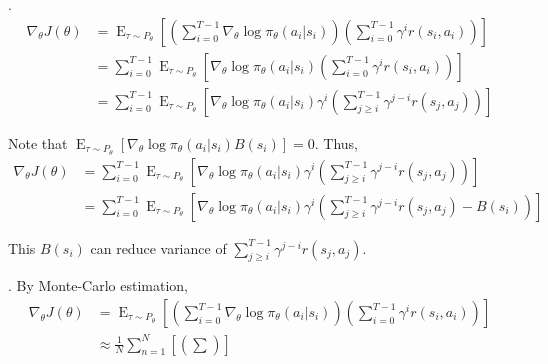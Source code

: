 \documentclass[8pt]{beamer}
\newcommand{\expe}{\operatorname{E}}
\begin{document}
\begin{frame}{.}
    \[
    \begin{aligned}
        \nabla_\theta J(\theta) &= \expe_{\tau \sim P_\theta} 
        \left[ \left(\sum_{i=0}^{T-1}\nabla_\theta \log{\pi_\theta}(a_i|s_i)\right) \left(\sum_{i=0}^{T-1} \gamma^i r(s_i, a_i) \right) \right] \\
        &= \sum_{i=0}^{T-1} \expe_{\tau \sim P_\theta} \left[
            \nabla_\theta \log{\pi_\theta(a_i|s_i)} \left(\sum_{i=0}^{T-1} \gamma^i r(s_i, a_i)\right)
        \right] \\
        &= \sum_{i=0}^{T-1} \expe_{\tau \sim P_\theta} \left[
            \nabla_\theta \log{\pi_\theta (a_i|s_i)} \gamma^i \left(\sum_{j\geq i}^{T-1} \gamma^{j-i}r(s_j, a_j)\right)
        \right]
    \end{aligned}
    \]

    Note that $\expe_{\tau \sim P_\theta}[\nabla_\theta \log{\pi_\theta}(a_i|s_i) B(s_i)] =0$. Thus,
    \[
    \begin{aligned}
        \nabla_\theta J(\theta) &=\sum_{i=0}^{T-1} \expe_{\tau \sim P_\theta} \left[
        \nabla_\theta \log{\pi_\theta (a_i|s_i)} \gamma^i \left(\sum_{j\geq i}^{T-1} \gamma^{j-i}r(s_j, a_j)\right)
        \right]\\
        &= \sum_{i=0}^{T-1} \expe_{\tau \sim P_\theta} \left[
            \nabla_\theta \log{\pi_\theta(a_i|s_i)} \gamma^i \left(  \sum_{j \geq i}^{T-1} \gamma^{j-i}r(s_j, a_j) - B(s_i)\right)
        \right]
    \end{aligned}
    \]

    This $B(s_i)$ can reduce variance of $\sum_{j \geq i }^{T-1} \gamma^{j-i} r(s_j, a_j)$.
\end{frame}

\begin{frame}{.}
    By Monte-Carlo estimation,
    \[
    \begin{aligned}
        \nabla_\theta J(\theta) &= \operatorname{E}_{\tau \sim P_\theta}\left[\left(\sum_{i=0}^{T-1}\nabla_\theta \log{\pi_\theta}(a_i|s_i)\right) \left(\sum_{i=0}^{T-1} \gamma^i r(s_i, a_i) \right)\right] \\
        &\approx \frac{1}{N} \sum_{n=1}^N \left[ \left(\sum_{}\right) \right]
    \end{aligned}
    \]
\end{frame}
\end{document}
